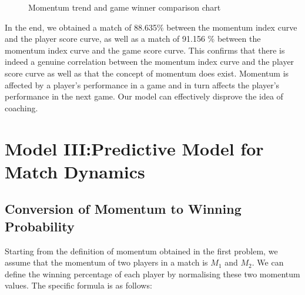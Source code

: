 \documentclass[12pt]{article}  %
\begin{document}
\begin{figure}[htbp]
    \centering    
    \caption{Momentum trend and game winner comparison chart}		%
    \label{Fig:Flexibility}									%
\end{figure}
\FloatBarrier

In the end, we obtained a match of 88.635\% between the momentum index curve and the player score curve, as well as a match of 91.156 \% between the momentum index curve and the game score curve. This confirms that there is indeed a genuine correlation between the momentum index curve and the player score curve as well as that the concept of momentum does exist. Momentum is affected by a player's performance in a game and in turn affects the player's performance in the next game. Our model can effectively disprove the idea of coaching.

\section{Model III:Predictive Model for Match Dynamics}

\subsection{Conversion of Momentum to Winning Probability}

Starting from the definition of momentum obtained in the first problem, we assume that the momentum of two players in a match is \(M_1\) and \(M_2\). We can define the winning percentage of each player by normalising these two momentum values. The specific formula is as follows:
\end{document}
